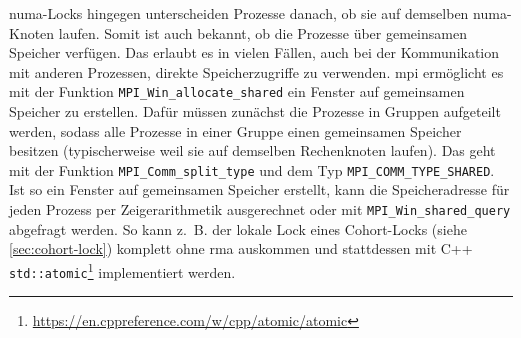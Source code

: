 \Gls{numa}-Locks hingegen unterscheiden Prozesse danach,
ob sie auf demselben \gls{numa}-Knoten laufen.
Somit ist auch bekannt,
ob die Prozesse über gemeinsamen Speicher verfügen.
Das erlaubt es in vielen Fällen,
auch bei der Kommunikation mit anderen Prozessen,
direkte Speicherzugriffe zu verwenden.
\Gls{mpi} ermöglicht es mit der Funktion \texttt{MPI\_Win\_allocate\_shared} ein \gls{Fenster} auf gemeinsamen Speicher zu erstellen.
Dafür müssen zunächst die Prozesse in Gruppen aufgeteilt werden,
sodass alle Prozesse in einer Gruppe einen gemeinsamen Speicher besitzen (typischerweise weil sie auf demselben Rechenknoten laufen).
Das geht mit der Funktion \texttt{MPI\_Comm\_split\_type} und dem Typ \texttt{MPI\_COMM\_TYPE\_SHARED}.
Ist so ein \gls{Fenster} auf gemeinsamen Speicher erstellt,
kann die Speicheradresse für jeden Prozess per Zeigerarithmetik ausgerechnet
oder mit \texttt{MPI\_Win\_shared\_query} abgefragt werden.
So kann z.~B. der lokale Lock eines Cohort-Locks (siehe \autoref{sec:cohort-lock}) komplett ohne \gls{rma} auskommen
und stattdessen mit C++ \texttt{std::atomic}\footnote{\url{https://en.cppreference.com/w/cpp/atomic/atomic}} implementiert werden.

\endinput
































